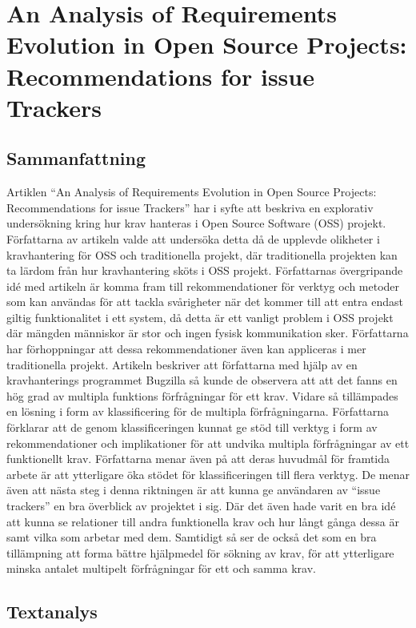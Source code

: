 \documentclass[a4paper]{article}
\begin{document}
\newpage
\section{An Analysis of Requirements Evolution in Open Source Projects: Recommendations for issue Trackers}
\subsection{Sammanfattning}
Artiklen “An Analysis of Requirements Evolution in Open Source Projects: Recommendations for issue Trackers” har i syfte att beskriva en explorativ undersökning kring hur krav hanteras i Open Source Software (OSS) projekt. Författarna av artikeln valde att undersöka detta då de upplevde olikheter i kravhantering för OSS och traditionella projekt, där traditionella projekten kan ta lärdom från hur kravhantering sköts i OSS projekt. Författarnas övergripande idé med artikeln är komma fram till rekommendationer för verktyg och metoder som kan användas för att tackla svårigheter när det kommer till att entra endast giltig funktionalitet i ett system, då detta är ett vanligt problem i OSS projekt där mängden människor är stor och ingen fysisk kommunikation sker. Författarna har förhoppningar att dessa rekommendationer även kan appliceras i mer traditionella projekt. Artikeln beskriver att författarna med hjälp av en kravhanterings programmet Bugzilla så kunde de observera att att det fanns en hög grad av multipla funktions förfrågningar för ett krav. Vidare så tillämpades en lösning i form av klassificering för de multipla förfrågningarna. Författarna förklarar att de genom klassificeringen kunnat ge stöd till verktyg i form av rekommendationer och implikationer för att undvika multipla förfrågningar av ett funktionellt krav. Författarna menar även på att deras huvudmål för framtida arbete är att ytterligare öka stödet för klassificeringen till flera verktyg. De menar även att nästa steg i denna riktningen är att kunna ge användaren av “issue trackers” en bra överblick av projektet i sig. Där det även hade varit en bra idé att kunna se relationer till andra funktionella krav och hur långt gånga dessa är samt vilka som arbetar med dem. Samtidigt så ser de också det som en bra tillämpning att forma bättre hjälpmedel för sökning av krav, för att ytterligare minska antalet multipelt förfrågningar för ett och samma krav. 

\subsection{Textanalys}
\end{document}
